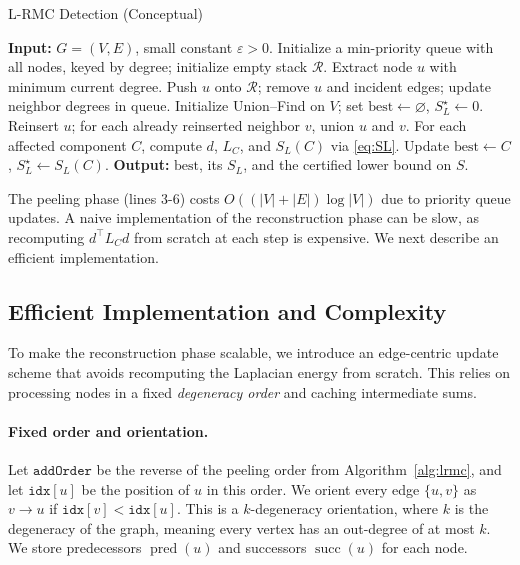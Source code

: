 \documentclass{article} %
\DeclareMathOperator{\pred}{pred}
\DeclareMathOperator{\succset}{succ}  %
\theoremstyle{remark}
\begin{document}
\begin{algorithm}[H]
\caption{L-RMC Detection (Conceptual)}
\label{alg:lrmc}
\begin{algorithmic}[1]
\STATE \textbf{Input:} \(G=(V,E)\), small constant \(\varepsilon>0\).
\STATE Initialize a min-priority queue with all nodes, keyed by degree; initialize empty stack \(\mathcal{R}\).
  \STATE Extract node \(u\) with minimum current degree.
  \STATE Push \(u\) onto \(\mathcal{R}\); remove \(u\) and incident edges; update neighbor degrees in queue.
\ENDWHILE
\STATE Initialize Union--Find on \(V\); set \(\mathrm{best}\gets \varnothing\), \(S_L^\star \gets 0\).
  \STATE Reinsert \(u\); for each already reinserted neighbor \(v\), union \(u\) and \(v\).
  \STATE For each affected component \(C\), compute \(d\), \(L_C\), and \(S_L(C)\) via \eqref{eq:SL}.
   \STATE Update \(\mathrm{best}\gets C\), \(S_L^\star\gets S_L(C)\). \ENDIF
\ENDFOR
\STATE \textbf{Output:} \(\mathrm{best}\), its \(S_L\), and the certified lower bound on \(S\).
\end{algorithmic}
\end{algorithm}

The peeling phase (lines 3-6) costs \(O((|V|+|E|)\log|V|)\) due to priority queue updates. A naive implementation of the reconstruction phase can be slow, as recomputing \(d^\top L_C d\) from scratch at each step is expensive. We next describe an efficient implementation.

\subsection{Efficient Implementation and Complexity}
To make the reconstruction phase scalable, we introduce an edge-centric update scheme that avoids recomputing the Laplacian energy from scratch. This relies on processing nodes in a fixed \emph{degeneracy order} and caching intermediate sums.

\paragraph{Fixed order and orientation.}
Let \(\texttt{addOrder}\) be the reverse of the peeling order from Algorithm~\ref{alg:lrmc}, and let \(\texttt{idx}[u]\) be the position of \(u\) in this order. We orient every edge \(\{u,v\}\) as \(v\to u\) if \(\texttt{idx}[v] < \texttt{idx}[u]\). This is a \(k\)-degeneracy orientation, where \(k\) is the degeneracy of the graph, meaning every vertex has an out-degree of at most \(k\). We store predecessors \(\pred(u)\) and successors \(\succset(u)\) for each node.
\end{document}
